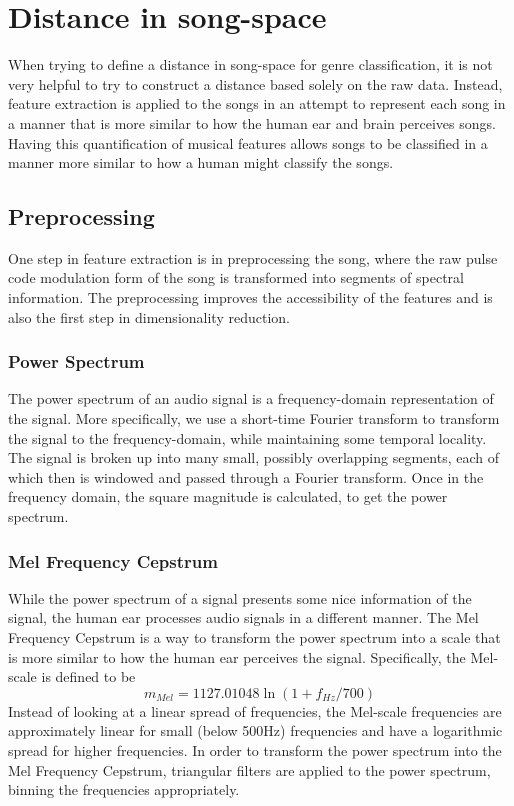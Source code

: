 \documentclass[12pt]{article}
\begin{document}
\section{Distance in song-space}

When trying to define a distance in song-space for genre classification, it is not very helpful to try to construct a distance based solely on the raw data.  Instead, feature extraction is applied to the songs in an attempt to represent each song in a manner that is more similar to how the human ear and brain perceives songs.  Having this quantification of musical features allows songs to be classified in a manner more similar to how a human might classify the songs.

\subsection{Preprocessing}

One step in feature extraction is in preprocessing the song, where the raw pulse code modulation form of the song is transformed into segments of spectral information.  The preprocessing improves the accessibility of the features and is also the first step in dimensionality reduction.

\subsubsection{Power Spectrum}
The power spectrum of an audio signal is a frequency-domain representation of the signal.  More specifically, we use a short-time Fourier transform to transform the signal to the frequency-domain, while maintaining some temporal locality.  The signal is broken up into many small, possibly overlapping segments, each of which then is windowed and passed through a Fourier transform.  Once in the frequency domain, the square magnitude is calculated, to get the power spectrum.

\subsubsection{Mel Frequency Cepstrum}
While the power spectrum of a signal presents some nice information of the signal, the human ear processes audio signals in a different manner.  The Mel Frequency Cepstrum is a way to transform the power spectrum into a scale that is more similar to how the human ear perceives the signal.  Specifically, the Mel-scale is defined to be
$$ m_{Mel} = 1127.01048 \ln(1 + f_{Hz}/700) $$
Instead of looking at a linear spread of frequencies, the Mel-scale frequencies are approximately linear for small (below 500Hz) frequencies and have a logarithmic spread for higher frequencies.  In order to transform the power spectrum into the Mel Frequency Cepstrum, triangular filters are applied to the power spectrum, binning the frequencies appropriately.\\
\end{document}
